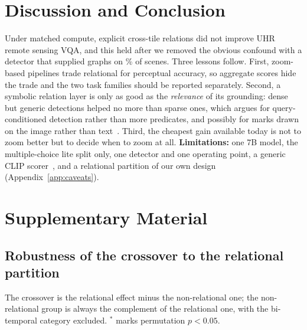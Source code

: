 \documentclass[runningheads]{llncs}
\begin{document}
\section{Discussion and Conclusion}

Under matched compute, explicit cross-tile relations did not improve UHR remote sensing VQA, and this held after we removed the obvious confound with a detector that supplied graphs on \gDcross\% of scenes. Three lessons follow. First, zoom-based pipelines trade relational for perceptual accuracy, so aggregate scores hide the trade and the two task families should be reported separately. Second, a symbolic relation layer is only as good as the \emph{relevance} of its grounding: dense but generic detections helped no more than sparse ones, which argues for query-conditioned detection rather than more predicates, and possibly for marks drawn on the image rather than text~\cite{izadi2025viser}. Third, the cheapest gain available today is not to zoom better but to decide when to zoom at all.
\textbf{Limitations:} one 7B model, the multiple-choice lite split only, one detector and one operating point, a generic CLIP scorer~\cite{liu2024remoteclip}, and a relational partition of our own design (Appendix~\ref{app:caveats}).




\clearpage
\appendix
\section{Supplementary Material}

\subsection{Robustness of the crossover to the relational partition}\label{app:partitions}
The crossover is the relational effect minus the non-relational one; the non-relational group is always the complement of the relational one, with the bi-temporal category excluded. $^{*}$ marks permutation $p<0.05$.
\begin{table}[H]
\centering
\caption{The crossover under alternative definitions of the relational group.}
\label{tab:partitions}
\setlength{\tabcolsep}{4pt}
\footnotesize

\end{table}
\end{document}
